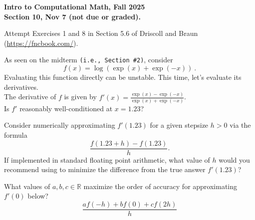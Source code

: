\documentclass[11pt]{article}
\begin{document}
\begin{center}
{\bf Intro to Computational Math, Fall 2025\\
Section 10, Nov 7 (not due or graded).\\
}
\end{center}


 Attempt Exercises 1 and 8 in Section 5.6 of Driscoll and Braun (\url{https://fncbook.com/}).

\vskip3cm

  As seen on the midterm \texttt{(i.e., Section \#2)}, consider
$$ 
f(x) = \log(\exp(x) + \exp(-x)) \ .  $$
Evaluating this function directly can be unstable. This time, let's evaluate its derivatives.\\

 The derivative of $f$ is given by $f'(x) = \frac{\exp(x) - \exp(-x)}{\exp(x) + \exp(-x)}$. \\
Is $f'$ reasonably well-conditioned at $x = 1.23$? \\

\vskip2cm

 Consider numerically approximating $f'(1.23)$ for a given stepsize $h>0$ via the formula 
$$ \frac{f(1.23 + h) - f(1.23)}{h} .$$
If implemented in standard floating point arithmetic, what value of $h$ would you recommend using to minimize the difference from the true answer $f'(1.23)$?


\vskip 2cm

 What values of $a,b,c\in\mathbb{R}$ maximize the order of accuracy for approximating $f'(0)$ below? 
$$ \frac{a f(-h) + bf(0) + cf(2h)}{h} $$
\end{document}
